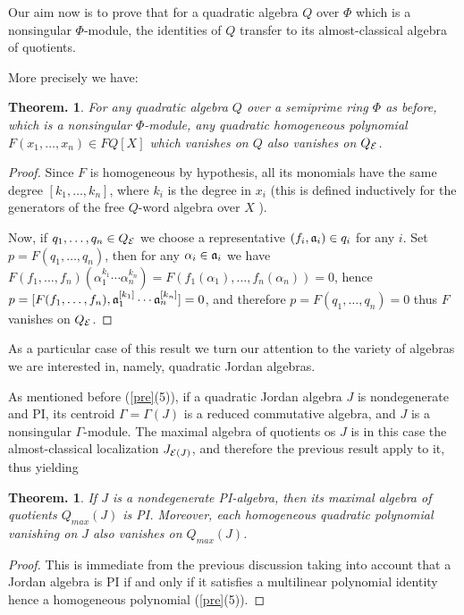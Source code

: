 \documentclass[a4paper,twoside,11pt]{article}
\theoremstyle{plain}
\theoremstyle{miestilo}
\newtheorem{teorema}[subsection]{Theorem.}
\theoremstyle{misnotas}
\begin{document}
Our aim now is to prove that for a quadratic algebra $Q$ over $\Phi$ which is a nonsingular $\Phi$-module, the identities of $Q$ transfer
to its almost-classical algebra of quotients.

More precisely we have:

\begin{teorema} For any quadratic algebra $Q$ over a semiprime ring $\Phi$ as before, which is a nonsingular $\Phi$-module,
any quadratic homogeneous polynomial $F(x_1,\dots,x_n) \in FQ[X]$ which vanishes on $Q$ also vanishes on $Q_{\cal E}$.
\end{teorema}
\begin{proof} Since $F$ is homogeneous by hypothesis, all its monomials have the same degree $[k_1,\dots,k_n]$, where $k_i$
is the degree in $x_i$ (this is defined inductively for the generators of the free $Q$-word algebra over $X$ \cite[3.1.5]{jac-struc}).

 Now, if $q_1,\dots,q_n \in Q_{\cal E}$ we choose a representative $(f_i,\frak {a}_i) \in q_i$ for any $i$. Set $p=F(q_1,\dots,q_n)$, then for any
$\alpha_i\in \frak{a}_i$ we have $F(f_1,\dots,f_n)(\alpha_{1}^{k_1}\cdots \alpha_{n}^{k_n})=F(f_{1}(\alpha_1),\dots,f_{n}(\alpha_n))=0$,
hence $p=[F(f_1,\dots,f_n),\frak {a}_{1}^{[k_1]}\cdots \frak {a}_{n}^{[k_n]}]=0$, and therefore $p=F(q_1,\dots,q_n)=0$ thus $F$ vanishes on $Q_{\cal E}$.

\end{proof}

As a particular case of this result we turn our attention to the variety of algebras we are interested in, namely, quadratic Jordan algebras.

As mentioned before (\ref{pre}(5)), if a quadratic Jordan algebra $J$ is nondegenerate and PI, its centroid $\Gamma=\Gamma(J)$
is a reduced commutative algebra, and $J$ is a nonsingular $\Gamma$-module. The maximal algebra of quotients os $J$ is in this case
the almost-classical localization $J_{{\cal E} (J)}$, and therefore the previous result apply to it, thus yielding

\begin{teorema} If $J$ is a nondegenerate PI-algebra, then its maximal algebra of quotients $Q_{max} (J)$ is PI. Moreover, each homogeneous
quadratic polynomial vanishing on $J$ also vanishes on $Q_{max}(J)$.\end{teorema}

\begin{proof} This is immediate from the previous discussion taking into account that a Jordan algebra is PI if and only if
it satisfies a multilinear polynomial identity hence a homogeneous polynomial (\ref{pre}(5)).\end{proof}
\end{document}
